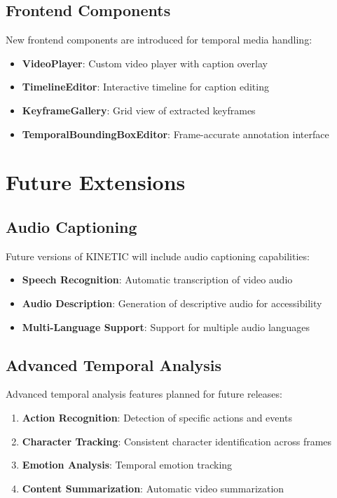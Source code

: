 \documentclass[10pt]{article}
\begin{document}
\subsection{Frontend Components}

New frontend components are introduced for temporal media handling:

\begin{itemize}
    \item \textbf{VideoPlayer}: Custom video player with caption overlay
    \item \textbf{TimelineEditor}: Interactive timeline for caption editing
    \item \textbf{KeyframeGallery}: Grid view of extracted keyframes
    \item \textbf{TemporalBoundingBoxEditor}: Frame-accurate annotation interface
\end{itemize}

\section{Future Extensions}

\subsection{Audio Captioning}

Future versions of KINETIC will include audio captioning capabilities:

\begin{itemize}
    \item \textbf{Speech Recognition}: Automatic transcription of video audio
    \item \textbf{Audio Description}: Generation of descriptive audio for accessibility
    \item \textbf{Multi-Language Support}: Support for multiple audio languages
\end{itemize}

\subsection{Advanced Temporal Analysis}

Advanced temporal analysis features planned for future releases:

\begin{enumerate}
    \item \textbf{Action Recognition}: Detection of specific actions and events
    \item \textbf{Character Tracking}: Consistent character identification across frames
    \item \textbf{Emotion Analysis}: Temporal emotion tracking
    \item \textbf{Content Summarization}: Automatic video summarization
\end{enumerate}
\end{document}
